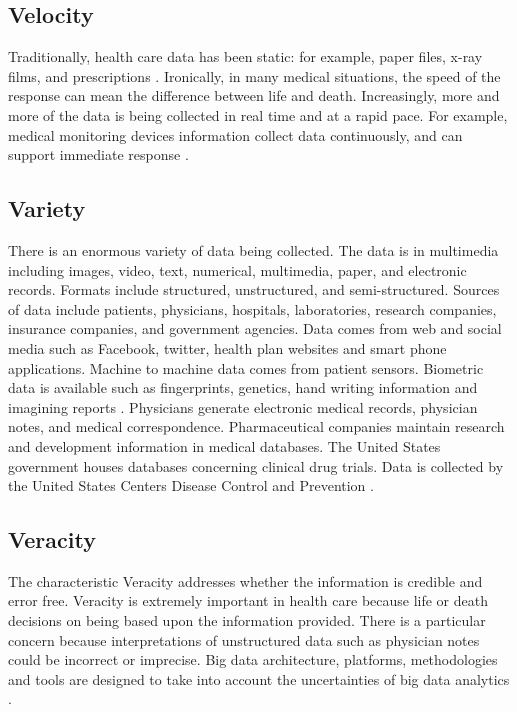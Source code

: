 \documentclass[sigconf]{acmart}
\begin{document}
\subsection{Velocity}

Traditionally, health care data has been static: for example, paper files, x-ray films, and prescriptions \cite{springer}. Ironically, in many medical situations, the speed of the response can mean the difference between life and death. Increasingly, more and more of the data is being collected in real time and at a rapid pace. For example, medical monitoring devices information collect data continuously, and can support immediate response \cite{springer}. 

\subsection{Variety}

There is an enormous variety of data being collected. The data is in multimedia including images, video, text, numerical, multimedia, paper, and electronic records.  Formats include structured, unstructured, and semi-structured.  Sources of data include patients, physicians, hospitals, laboratories, research companies, insurance companies, and government agencies. Data comes from web and social media such as Facebook, twitter, health plan websites and smart phone applications. Machine to machine data comes from patient sensors. Biometric data is available such as fingerprints, genetics, hand writing information and imagining reports \cite{springer}. Physicians generate electronic medical records, physician notes, and medical correspondence. Pharmaceutical companies maintain research and development information in medical databases. The United States government houses databases concerning clinical drug trials. Data is collected by the United States Centers Disease Control and Prevention \cite{www-google-CIO}. 

\subsection{Veracity}

The characteristic Veracity addresses whether the information is credible and error free. Veracity is extremely important in health care because life or death decisions on being based upon the information provided. There is a particular concern because interpretations of unstructured data such as physician notes could be incorrect or imprecise. Big data architecture, platforms, methodologies and tools are designed to take into account the uncertainties of big data analytics \cite{springer}. 
\end{document}
